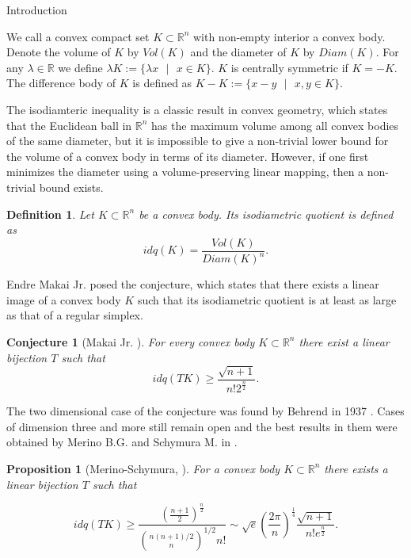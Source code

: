 \documentclass[12pt]{article}
\newtheorem{proposition}{Proposition}[section]
\newtheorem{conj}{Conjecture}[section]
\newtheorem{definition}{Definition}[section]
\begin{document}
    
\begin{section}{Introduction}

    We call a convex compact set $K\subset\mathbb{R}^{n}$ with non-empty interior a convex body. Denote the volume of $K$ by $Vol(K)$ and the diameter of $K$ by $Diam(K).$ For any $\lambda \in \mathbb{R}$ we define $\lambda K := \{\lambda x \text{ }\vert \text{ } x\in K\}$. $K$ is centrally symmetric if $K = -K$. The difference body of $K$ is defined as $K-K:=\{x-y \text{ }\vert\text{ } x,y\in K\}$.
    
    The isodiamteric inequality is a classic result in convex geometry, which states  that the Euclidean ball in $\mathbb{R}^n$ has the maximum volume among all convex bodies of the same diameter, but it is impossible to give a non-trivial lower bound for the volume of a convex body in terms of its diameter. However, if one first minimizes the diameter using a volume-preserving linear mapping, then a non-trivial bound exists. 

    \begin{definition}
        Let $K \subset \mathbb{R}^{n}$ be a convex body. Its isodiametric quotient is defined as 
        $$
            idq(K) = \frac{Vol(K)}{Diam(K)^n}.
        $$
    \end{definition}    

    Endre Makai Jr.  posed the conjecture, which states that there exists a linear image of a convex body $K$ such that its isodiametric quotient is at least as large as  that of a regular simplex.
    
    \begin{conj}[Makai Jr. \cite{makai1978}]
        For every convex body $K\subset \mathbb{R}^n$ there exist a linear bijection $T$ such that 
        $$
            idq(TK)\geq \frac{\sqrt{n+1}}{n! 2^{\frac{n}{2}}}.
        $$
    \end{conj}
    
    The two dimensional case of the conjecture was found by Behrend in 1937 \cite{behrend}. Cases of dimension three and more still remain open and the best results in them were obtained by Merino B.G. and  Schymura M. in \cite{shimura}. 

    \begin{proposition}[Merino-Schymura, \cite{shimura}] For a convex body $K \subset \mathbb{R}^{n}$ there exists a linear bijection $T$ such that

    $$
        idq(TK)\geq \frac{\left(\frac{n+1}{2}\right)^{\frac{n}{2}}}{\binom{n(n+1)/2}{n}^{1/2}n!} \sim \sqrt{e}\left(\frac{2\pi}{n}\right)^{\frac{1}{4}}\frac{\sqrt{n+1}}{n!e^{\frac{n}{2}}}.
    $$
        

\end{proposition}
\end{section}
\end{document}
